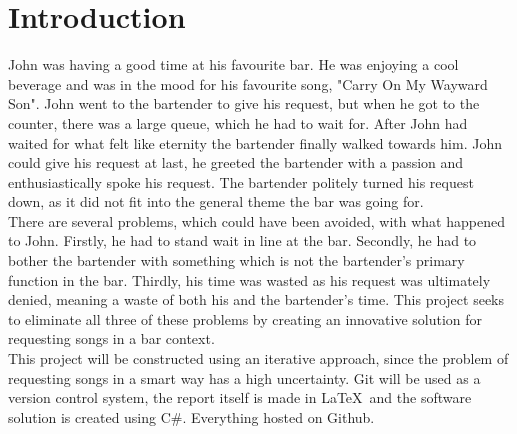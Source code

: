 \chapter{Introduction}
John was having a good time at his favourite bar. He was enjoying a cool beverage and was in the mood for his favourite song, "Carry On My Wayward Son". John went to the bartender to give his request, but when he got to the counter, there was a large queue, which he had to wait for. After John had waited for what felt like eternity the bartender finally walked towards him. John could give his request at last, he greeted the bartender with a passion and enthusiastically spoke his request. The bartender politely turned his request down, as it did not fit into the general theme the bar was going for.\\

There are several problems, which could have been avoided, with what happened to John. Firstly, he had to stand wait in line at the bar. Secondly, he had to bother the bartender with something which is not the bartender's primary function in the bar. Thirdly, his time was wasted as his request was ultimately denied, meaning a waste of both his and the bartender's time.
This project seeks to eliminate all three of these problems by creating an innovative solution for requesting songs in a bar context.\\

This project will be constructed using an iterative approach, since the problem of requesting songs in a smart way has a high uncertainty. Git will be used as a version control system, the report itself is made in \LaTeX\ and the software solution is created using C\#. Everything hosted on Github.
